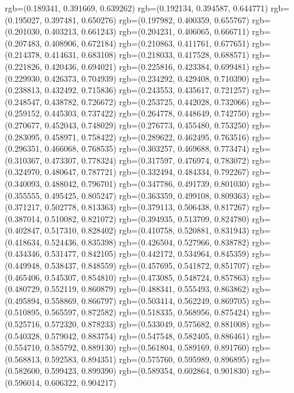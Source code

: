 {{{					rgb=(0.189341, 0.391669, 0.639262)
					rgb=(0.192134, 0.394587, 0.644771)
					rgb=(0.195027, 0.397481, 0.650276)
					rgb=(0.197982, 0.400359, 0.655767)
					rgb=(0.201030, 0.403213, 0.661243)
					rgb=(0.204231, 0.406065, 0.666711)
					rgb=(0.207483, 0.408906, 0.672184)
					rgb=(0.210863, 0.411761, 0.677651)
					rgb=(0.214378, 0.414631, 0.683108)
					rgb=(0.218033, 0.417528, 0.688571)
					rgb=(0.221826, 0.420436, 0.694021)
					rgb=(0.225816, 0.423384, 0.699481)
					rgb=(0.229930, 0.426373, 0.704939)
					rgb=(0.234292, 0.429408, 0.710390)
					rgb=(0.238813, 0.432492, 0.715836)
					rgb=(0.243553, 0.435617, 0.721257)
					rgb=(0.248547, 0.438782, 0.726672)
					rgb=(0.253725, 0.442028, 0.732066)
					rgb=(0.259152, 0.445303, 0.737422)
					rgb=(0.264778, 0.448649, 0.742750)
					rgb=(0.270677, 0.452043, 0.748029)
					rgb=(0.276773, 0.455480, 0.753250)
					rgb=(0.283095, 0.458971, 0.758422)
					rgb=(0.289622, 0.462495, 0.763516)
					rgb=(0.296351, 0.466068, 0.768535)
					rgb=(0.303257, 0.469688, 0.773474)
					rgb=(0.310367, 0.473307, 0.778324)
					rgb=(0.317597, 0.476974, 0.783072)
					rgb=(0.324970, 0.480647, 0.787721)
					rgb=(0.332494, 0.484334, 0.792267)
					rgb=(0.340093, 0.488042, 0.796701)
					rgb=(0.347786, 0.491739, 0.801030)
					rgb=(0.355555, 0.495425, 0.805247)
					rgb=(0.363359, 0.499108, 0.809363)
					rgb=(0.371217, 0.502778, 0.813363)
					rgb=(0.379113, 0.506438, 0.817267)
					rgb=(0.387014, 0.510082, 0.821072)
					rgb=(0.394935, 0.513709, 0.824780)
					rgb=(0.402847, 0.517310, 0.828402)
					rgb=(0.410758, 0.520881, 0.831943)
					rgb=(0.418634, 0.524436, 0.835398)
					rgb=(0.426504, 0.527966, 0.838782)
					rgb=(0.434346, 0.531477, 0.842105)
					rgb=(0.442172, 0.534964, 0.845359)
					rgb=(0.449948, 0.538437, 0.848559)
					rgb=(0.457695, 0.541872, 0.851707)
					rgb=(0.465406, 0.545307, 0.854810)
					rgb=(0.473085, 0.548724, 0.857863)
					rgb=(0.480729, 0.552119, 0.860879)
					rgb=(0.488341, 0.555493, 0.863862)
					rgb=(0.495894, 0.558869, 0.866797)
					rgb=(0.503414, 0.562249, 0.869705)
					rgb=(0.510895, 0.565597, 0.872582)
					rgb=(0.518335, 0.568956, 0.875424)
					rgb=(0.525716, 0.572320, 0.878233)
					rgb=(0.533049, 0.575682, 0.881008)
					rgb=(0.540328, 0.579042, 0.883754)
					rgb=(0.547548, 0.582405, 0.886461)
					rgb=(0.554710, 0.585792, 0.889130)
					rgb=(0.561804, 0.589169, 0.891760)
					rgb=(0.568813, 0.592583, 0.894351)
					rgb=(0.575760, 0.595989, 0.896895)
					rgb=(0.582600, 0.599423, 0.899390)
					rgb=(0.589354, 0.602864, 0.901830)
					rgb=(0.596014, 0.606322, 0.904217)
}}}
